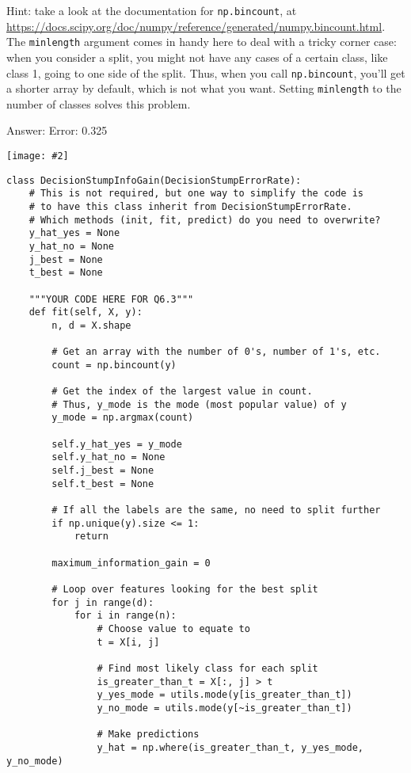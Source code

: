 \documentclass{article}
\newcommand{\gre}[1]{\textcolor{gre}{#1}}
\newcommand\ans[1]{\par\gre{Answer: #1}}
\newcommand{\centerfig}[2]{\begin{center}\texttt{[image: \#2]}\end{center}}
\begin{document}
  Hint: take a look at the documentation for \texttt{np.bincount}, at \\
  \url{https://docs.scipy.org/doc/numpy/reference/generated/numpy.bincount.html}.
  The \texttt{minlength} argument comes in handy here to deal with a tricky corner case:
  when you consider a split, you might not have any cases of a certain class, like class 1,
  going to one side of the split. Thus, when you call \texttt{np.bincount}, you'll get
  a shorter array by default, which is not what you want. Setting \texttt{minlength} to the
  number of classes solves this problem.
\ans{ 
  \newline
  Error: 0.325
  \centerfig{0.7}{./figs/DecisionStumpInfoGain_decisionBoundary}
  }
  \newpage
\begin{verbatim}
class DecisionStumpInfoGain(DecisionStumpErrorRate):
    # This is not required, but one way to simplify the code is
    # to have this class inherit from DecisionStumpErrorRate.
    # Which methods (init, fit, predict) do you need to overwrite?
    y_hat_yes = None
    y_hat_no = None
    j_best = None
    t_best = None

    """YOUR CODE HERE FOR Q6.3"""
    def fit(self, X, y):
        n, d = X.shape

        # Get an array with the number of 0's, number of 1's, etc.
        count = np.bincount(y)

        # Get the index of the largest value in count.
        # Thus, y_mode is the mode (most popular value) of y
        y_mode = np.argmax(count)

        self.y_hat_yes = y_mode
        self.y_hat_no = None
        self.j_best = None
        self.t_best = None

        # If all the labels are the same, no need to split further
        if np.unique(y).size <= 1:
            return

        maximum_information_gain = 0

        # Loop over features looking for the best split
        for j in range(d):
            for i in range(n):
                # Choose value to equate to
                t = X[i, j]

                # Find most likely class for each split
                is_greater_than_t = X[:, j] > t
                y_yes_mode = utils.mode(y[is_greater_than_t])
                y_no_mode = utils.mode(y[~is_greater_than_t])

                # Make predictions
                y_hat = np.where(is_greater_than_t, y_yes_mode, y_no_mode)


\end{verbatim}
\end{document}
